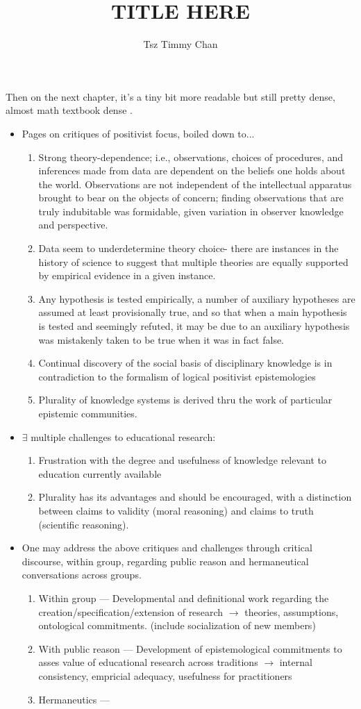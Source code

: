 \documentclass{TC}
\title{TITLE HERE}	%
\author{Tsz Timmy Chan}	%
\begin{document}
Then on the next chapter, it's a tiny bit more readable but still pretty dense, almost math textbook dense \parencite{green_epistemology_2006}.
	\begin{itemize}
	\item Pages on critiques of positivist focus, boiled down to...
		\begin{enumerate}
		\item Strong theory-dependence; i.e., observations, choices of procedures, and inferences made from data are dependent on the beliefs one holds about the world. Observations are not independent of the intellectual apparatus brought to bear on the objects of concern; finding observations that are truly indubitable was formidable, given variation in observer knowledge and perspective. 
		\item Data seem to underdetermine theory choice- there are instances in the history of science to suggest that multiple theories are equally supported by empirical evidence in a given instance.
		\item Any hypothesis is tested empirically, a number of auxiliary hypotheses are assumed at least provisionally true, and so that when a main hypothesis is tested and seemingly refuted, it may be due to an auxiliary hypothesis was mistakenly taken to be true when it was in fact false.
		\item Continual discovery of the social basis of disciplinary knowledge is in contradiction to the formalism of logical positivist epistemologies
		\item Plurality of knowledge systems is derived thru the work of particular epistemic communities.
		\end{enumerate}	
	\item $\exists$ multiple challenges to educational research:
		\begin{enumerate}
		\item Frustration with the degree and usefulness of knowledge relevant to education currently available
		\item Plurality has its advantages and should be encouraged, with a distinction between claims to validity (moral reasoning) and claims to truth (scientific reasoning).
		\end{enumerate}	
	\item One may address the above critiques and challenges through critical discourse, within group, regarding public reason and hermaneutical conversations across groups.
		\begin{enumerate}
		\item Within group --- Developmental and definitional work regarding the creation/specification/extension of research $\rightarrow$ theories, assumptions, ontological commitments. (include socialization of new members)
		\item With public reason --- Development of epistemological commitments to asses value of educational research across traditions $\rightarrow$ internal consistency, empricial adequacy, usefulness for practitioners
		\item Hermaneutics --- 
		\end{enumerate}
	\end{itemize}
\end{document}
